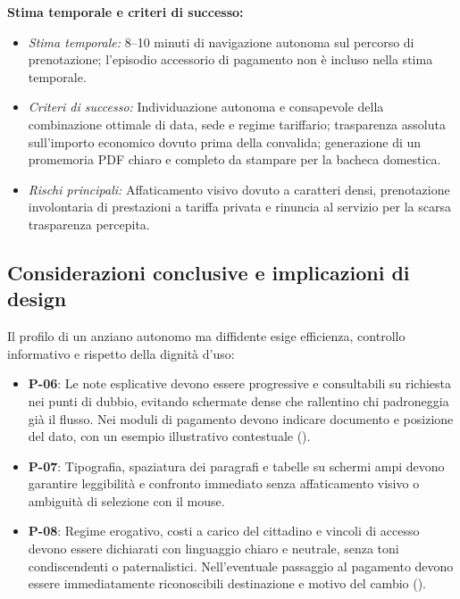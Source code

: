 \textbf{Stima temporale e criteri di successo:}
\begin{itemize}[leftmargin=*,topsep=1.5pt,itemsep=0.5pt,parsep=0pt]
\item \textit{Stima temporale:} 8--10 minuti di navigazione autonoma sul percorso di prenotazione; l'episodio accessorio di pagamento non è incluso nella stima temporale.
\item \textit{Criteri di successo:} Individuazione autonoma e consapevole della combinazione ottimale di data, sede e regime tariffario; trasparenza assoluta sull'importo economico dovuto prima della convalida; generazione di un promemoria PDF chiaro e completo da stampare per la bacheca domestica.
\item \textit{Rischi principali:} Affaticamento visivo dovuto a caratteri densi, prenotazione involontaria di prestazioni a tariffa privata e rinuncia al servizio per la scarsa trasparenza percepita.
\end{itemize}

\subsection[Implicazioni progettuali]{Considerazioni conclusive e implicazioni di design}
\vspace{-2pt}
Il profilo di un anziano autonomo ma diffidente esige efficienza, controllo informativo e rispetto della dignità d'uso:
\begin{itemize}[leftmargin=*,topsep=1.5pt,itemsep=0.5pt,parsep=0pt]
\item \hypertarget{req:P-06}{}\textbf{P-06}: Le note esplicative devono essere progressive e consultabili su richiesta nei punti di dubbio, evitando schermate dense che rallentino chi padroneggia già il flusso. Nei moduli di pagamento devono indicare documento e posizione del dato, con un esempio illustrativo contestuale ().
\item \hypertarget{req:P-07}{}\textbf{P-07}: Tipografia, spaziatura dei paragrafi e tabelle su schermi ampi devono garantire leggibilità e confronto immediato senza affaticamento visivo o ambiguità di selezione con il mouse.
\item \hypertarget{req:P-08}{}\textbf{P-08}: Regime erogativo, costi a carico del cittadino e vincoli di accesso devono essere dichiarati con linguaggio chiaro e neutrale, senza toni condiscendenti o paternalistici. Nell'eventuale passaggio al pagamento devono essere immediatamente riconoscibili destinazione e motivo del cambio ().
\end{itemize}

